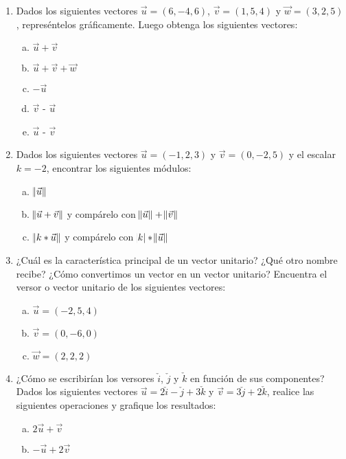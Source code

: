 \documentclass[11pt,a4paper]{article}
\begin{document}
\begin{enumerate}
\item Dados los siguientes vectores $\vec{u} = (6, -4, 6)$, $\vec{v} = (1, 5, 4)$ y $\vec{w} = (3, 2, 5)$, repres\'entelos gr\'aficamente. Luego obtenga los siguientes vectores:

\begin{enumerate}[a)]
\item $\vec{u} + \vec{v}$ 
\item $\vec{u} + \vec{v} + \vec{w}$
\item $-\vec{u}$
\item $\vec{v}$ - $\vec{u}$
\item $\vec{u}$ - $\vec{v}$
\end{enumerate}

\item Dados los siguientes vectores $\vec{u} = (-1, 2, 3)$ y $\vec{v} = (0, -2, 5)$ y el escalar $k = -2$, encontrar los siguientes m\'odulos: \par

\begin{enumerate}[a)]
\item $\norm{\vec{u}}$
\item $\norm{\vec{u} + \vec{v}}$ y comp\'arelo con $\norm{\vec{u}} + \norm{\vec{v}}$
\item $\norm{k * \vec{u}}$ y comp\'arelo con $\abs{k} * \norm{\vec{u}}$ 
\end{enumerate}

\item ¿Cu\'al es la caracter\'istica principal de un vector unitario? ¿Qu\'e otro nombre recibe? ¿C\'omo convertimos un vector en un vector unitario? Encuentra el versor o vector unitario de los siguientes vectores: 

\begin{enumerate}[a)]
\item $\vec{u} = (-2, 5, 4)$
\item $\vec{v} = (0, -6, 0)$
\item $\vec{w} = (2, 2, 2)$
\end{enumerate}

\item ¿C\'omo se escribir\'ian los versores $\check{i}$, $\check{j}$ y $\check{k}$ en funci\'on de sus componentes? Dados los siguientes vectores $\vec{u} = 2 \check{i} - \check{j} + 3 \check{k}$ y $\vec{v} = 3 \check{j} + 2 \check{k}$, realice las siguientes operaciones y grafique los resultados:

\begin{enumerate}[a)]
\item $2\vec{u} + \vec{v}$
\item $-\vec{u} + 2\vec{v}$ 
\end{enumerate}


\end{enumerate}
\end{document}
